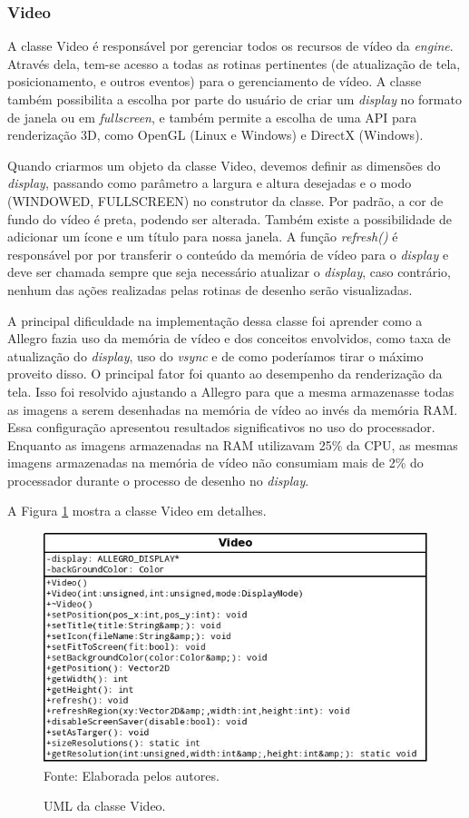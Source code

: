 \subsubsection{Video}
%
%
A classe Video é responsável por gerenciar todos os recursos de vídeo da \textit{engine}. Através dela, tem-se acesso a todas as rotinas pertinentes (de atualização de tela, posicionamento, e outros eventos) para o gerenciamento de vídeo. A classe também possibilita a escolha por parte do usuário de criar um \textit{display} no formato de janela ou em \textit{fullscreen}, e também permite a escolha de uma API para renderização 3D, como OpenGL (Linux e Windows) e DirectX (Windows). 
\par 
Quando criarmos um objeto da classe Video, devemos definir as dimensões do \textit{display}, passando como parâmetro a largura e altura desejadas e o modo (WINDOWED, FULLSCREEN) no construtor da classe. Por padrão, a cor de fundo do vídeo é preta, podendo ser alterada. Também existe a possibilidade de adicionar um ícone e um título para nossa janela. A função \textit{refresh()} é responsável por por transferir o conteúdo da memória de vídeo para o \textit{display} e deve ser chamada sempre que seja necessário atualizar o \textit{display}, caso contrário, nenhum das ações realizadas pelas rotinas de desenho serão visualizadas. 
\par 
A principal dificuldade na implementação dessa classe foi aprender como a Allegro fazia uso da memória de vídeo e dos conceitos envolvidos, como taxa de atualização do \textit{display}, uso do \textit{vsync} e de como poderíamos tirar o máximo proveito disso. O principal fator foi quanto ao desempenho da renderização da tela. Isso foi resolvido ajustando a Allegro para que a mesma armazenasse todas as imagens a serem desenhadas na memória de vídeo ao invés da memória RAM. Essa configuração apresentou resultados significativos no uso do processador. Enquanto as imagens armazenadas na RAM utilizavam 25\% da CPU, as mesmas imagens armazenadas na memória de vídeo não consumiam mais de 2\% do processador durante o processo de desenho no \textit{display}.
\par
A Figura \ref{umlVideo} mostra a classe Video em detalhes.
%
%
%
%
\begin{figure}[H]
    \centering
    \caption{UML da classe Video.}
    \label{umlVideo}
    \includegraphics[scale = 0.5]{uml/video.jpeg}
    \\Fonte: Elaborada pelos autores.
\end{figure}
